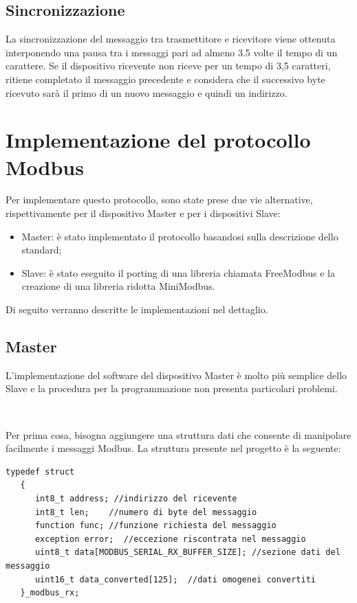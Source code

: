 \documentclass[a4paper,titlepage]{book}
\newcommand{\itema}{\begin{itemize}[noitemsep,topsep=10pt,parsep=5pt,partopsep=10pt]}
\begin{document}
\subsection{Sincronizzazione}
La sincronizzazione del messaggio tra trasmettitore e ricevitore viene ottenuta interponendo una pausa tra i messaggi pari ad almeno 3.5 volte il tempo di un carattere. Se il dispositivo ricevente non riceve per un tempo di 3,5 caratteri, ritiene completato il messaggio precedente e considera che il successivo byte ricevuto sarà il primo di un nuovo messaggio e quindi un indirizzo.


\section{Implementazione del protocollo Modbus}

Per implementare questo protocollo, sono state prese due vie alternative, rispettivamente per il dispositivo Master e per i dispositivi Slave:


\itema

\item Master: è stato implementato il protocollo basandosi sulla descrizione dello standard;
\item Slave: è stato eseguito il porting di una libreria chiamata FreeModbus e la creazione di una libreria ridotta MiniModbus.

\end{itemize}

Di seguito verranno descritte le implementazioni nel dettaglio.

\subsection{Master}

L'implementazione del software del dispositivo Master è molto più semplice dello Slave e la procedura per la programmazione non presenta particolari problemi.

~

Per prima cosa, bisogna aggiungere una struttura dati che consente di manipolare facilmente i messaggi Modbus. La struttura presente nel progetto è la seguente:

\begin{lstlisting}[showlines=false]
typedef struct
   {
      int8_t address; //indirizzo del ricevente
      int8_t len;    //numero di byte del messaggio
      function func; //funzione richiesta del messaggio
      exception error;  //eccezione riscontrata nel messaggio
      uint8_t data[MODBUS_SERIAL_RX_BUFFER_SIZE]; //sezione dati del messaggio
      uint16_t data_converted[125];  //dati omogenei convertiti
   }_modbus_rx;
\end{lstlisting}
\end{document}
